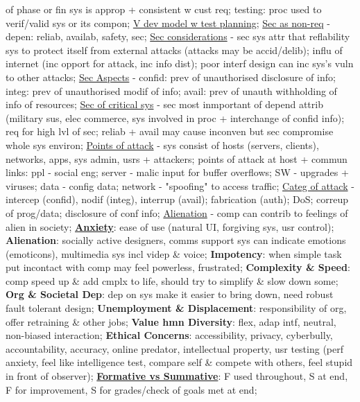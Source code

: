 \documentclass[a4paper]{article}
\begin{document}
\begin{multicols}{3}
        of phase or fin sys is approp + consistent w cust req; testing: proc used to verif/valid sys or its compon; \underline{V dev model w test planning}; \underline{Sec as non-req} - depen: reliab, availab, safety, sec;
        \underline{Sec considerations} - sec sys attr that reflability sys to protect itself from external attacks (attacks may be accid/delib); influ of internet (inc opport for attack, inc info dist); poor interf design
        can inc sys's vuln to other attacks; \underline{Sec Aspects} - confid: prev of unauthorised disclosure of info; integ: prev of unauthorised modif of info; avail: prev of unauth withholding of info of resources;
        \underline{Sec of critical sys} - sec most inmportant of depend attrib (military sus, elec commerce, sys involved in proc + interchange of confid info); req for high lvl of sec; reliab + avail may cause inconven but
        sec compromise whole sys environ; \underline{Points of attack} - sys consist of hosts (servers, clients), networks, apps, sys admin, usrs + attackers; points of attack at host + commun links: ppl - social eng;
        server - malic input for buffer overflows; SW - upgrades + viruses; data - config data; network - "spoofing" to access traffic; \underline{Categ of attack} - intercep (confid), nodif (integ), interrup (avail);
        fabrication (auth); DoS; correup of prog/data; disclosure of conf info; \underline{Alienation} - comp can contrib to feelings of alien in society;
        \underline{\textbf{Anxiety}}: ease of use (natural UI, forgiving sys, usr control);
        \textbf{Alienation}: socially active designers, comms support sys can indicate emotions (emoticons), multimedia sys incl videp \& voice;
        \textbf{Impotency}: when simple task put incontact with comp may feel powerless, frustrated;
        \textbf{Complexity \& Speed}: comp speed up \& add cmplx to life, should try to simplify \& slow down some;
        \textbf{Org \& Societal Dep}: dep on sys make it easier to bring down, need robust fault tolerant design;
        \textbf{Unemployment \& Displacement}: responsibility of org, offer retraining \& other jobs;
        \textbf{Value hmn Diversity}: flex, adap intf, neutral, non-biased interaction;
        \textbf{Ethical Concerns}: accessibility, privacy, cyberbully, accountability, accuracy, online predator, intellectual property, usr testing (perf anxiety, feel like intelligence test, compare self \& compete with others, feel stupid in front of observer);
        \underline{\textbf{Formative vs Summative}}: F used throughout, S at end, F for improvement, S for grades/check of goals met at end;

    \end{multicols}
\end{document}

